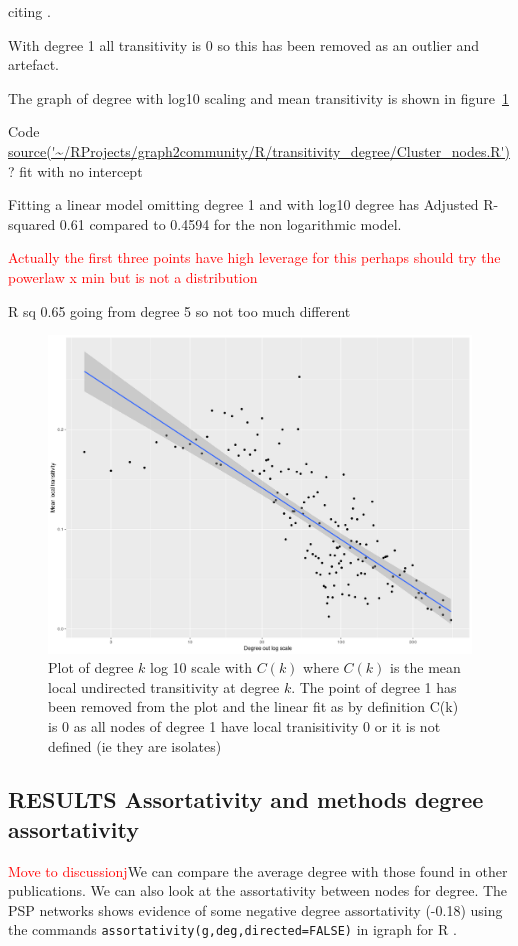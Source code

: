 citing \cite{yook2004functional}.

With degree 1 all transitivity is 0 so this has been removed as an outlier and artefact.

The graph of degree with log10 scaling and mean transitivity is shown in figure~\ref{fig:C(k)_remove0}


Code \url{source('~/RProjects/graph2community/R/transitivity_degree/Cluster_nodes.R')}
? fit with no intercept

Fitting a linear model omitting degree 1 and with log10 degree has Adjusted R-squared 0.61 compared to 0.4594 for the non logarithmic model.

\textcolor{red}{Actually the first three points have high leverage for this perhaps should try the powerlaw x min but is not a distribution}

R sq 0.65 going from degree 5 so not too much different

\begin{figure}
    \centering
    \includegraphics[width=\textwidth]{images/Rplot_k(c)_remove0.png}
    \caption{Plot of degree $k$ log 10 scale with $C(k)$ where $C(k)$ is the mean local undirected transitivity at degree $k$. The point of degree 1 has been removed from the plot and the linear fit as by definition C(k) is 0 as all nodes of degree 1 have local tranisitivity 0 or it is not defined (ie they are isolates)}
    \label{fig:C(k)_remove0}
\end{figure}

\subsection{RESULTS Assortativity and methods degree assortativity}
\textcolor{red}{Move to discussionj}We can compare the average degree with those found in other publications. We can also look at the assortativity between nodes for degree. The PSP networks shows evidence of some negative degree assortativity (-0.18) using the commands \texttt{assortativity(g,deg,directed=FALSE)} in igraph for R .

